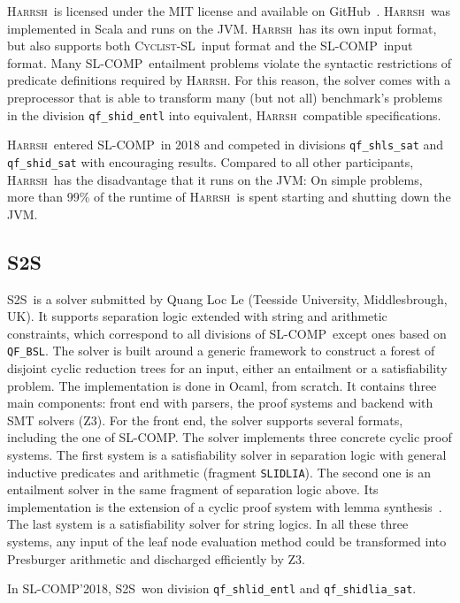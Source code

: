 \documentclass[orivec]{llncs}
\newcommand{\CYCLIST}{\textsc{Cyclist-SL}}
\newcommand{\HARRSH}{\textsc{Harrsh}}
\newcommand{\STS}{\textsc{S2S}}
\newcommand{\slcomp}{\textsf{SL-COMP}}
\begin{document}
\HARRSH\ is licensed under the MIT license and available on GitHub~\cite{HARRSHsite}.
\HARRSH\ was implemented in Scala and runs on the JVM.
\HARRSH\ has its own input format, but also supports both \CYCLIST\
input format and the \slcomp\ input format.
Many \slcomp\ entailment problems violate the syntactic restrictions of 
predicate definitions required by \HARRSH. For this reason, the solver
comes with a preprocessor that is able to transform many (but not all) benchmark's problems
in the division \verb|qf_shid_entl| into equivalent, \HARRSH\ compatible specifications.

\HARRSH\ entered \slcomp\ in 2018 and competed in divisions \verb|qf_shls_sat| and \verb|qf_shid_sat| with encouraging results.
Compared to all other participants, \HARRSH\ has the disadvantage that it runs on the JVM: On simple problems, more than 99\% of the runtime of \HARRSH\ is spent starting and shutting down the JVM. 


\subsection{\STS}

\STS\ is a solver submitted by Quang Loc Le (Teesside University, Middlesbrough, UK).
It supports separation logic extended with string and arithmetic constraints, which
correspond to all divisions of \slcomp\ except ones based on \verb|QF_BSL|.
The solver is built around a generic framework to construct a forest of disjoint cyclic reduction trees for an input, either an entailment or a satisfiability problem.
The implementation is done in Ocaml, from scratch. It contains three main components: front end with parsers, the proof systems and backend with SMT solvers (Z3). 
For the front end, the solver supports several formats, including the one of \slcomp.
The solver implements three concrete cyclic proof systems. 
The first system is a satisfiability solver in separation logic with general inductive predicates and arithmetic (fragment \verb|SLIDLIA|). 
The second one is an entailment solver in the same fragment of separation logic above. Its implementation is the extension of a cyclic proof system with lemma synthesis~\cite{DBLP:conf/tacas/Le0Q18}. 
The last system is a satisfiability solver for string logics. 
In all these three systems, any input of the leaf node evaluation method could be transformed into Presburger arithmetic and discharged efficiently by Z3.

In \slcomp'2018, \STS\ won division \verb|qf_shlid_entl| and \verb|qf_shidlia_sat|.
\end{document}

